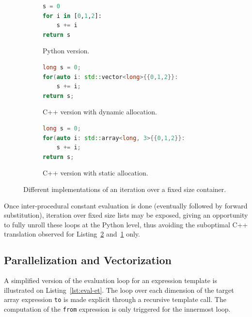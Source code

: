 \documentclass[10pt, preprint]{sigplanconf}
\begin{document}
\begin{figure}

    \begin{subfigure}{.5\textwidth}
    \begin{lstlisting}[language=python]
s = 0
for i in [0,1,2]:
    s += i
return s
\end{lstlisting}
\caption{Python version.}
\end{subfigure}

    \begin{subfigure}{.5\textwidth}
\begin{lstlisting}[language=c++]
long s = 0;
for(auto i: std::vector<long>{{0,1,2}}:
    s += i;
return s;
\end{lstlisting}
\caption{C++ version with dynamic allocation.}
\label{lst:dyna}
\end{subfigure}

    \begin{subfigure}{.5\textwidth}
\begin{lstlisting}[language=c++]
long s = 0;
for(auto i: std::array<long, 3>{{0,1,2}}:
    s += i;
return s;
\end{lstlisting}
\caption{C++ version with static allocation.}
\label{lst:stat}
\end{subfigure}

    \caption{Different implementations of an iteration over a fixed size container.}
    \label{fig:unroll-range}

\end{figure}

Once inter-procedural constant evaluation is done (eventually followed by
forward substitution), iteration over fixed size lists may be exposed, giving an
opportunity to fully unroll these loops at the Python level, thus avoiding the
suboptimal C++ translation observed for Listing~\ref{lst:stat}
and~\ref{lst:dyna} only.

\subsection{Parallelization and Vectorization}

A simplified version of the evaluation loop for an expression template is
illustrated on Listing~\ref{lst:eval-et}. The loop over each dimension of the
target array expression \texttt{to} is made explicit through a recursive
template call. The computation of the \texttt{from} expression is only triggered
for the innermost loop.
\end{document}
